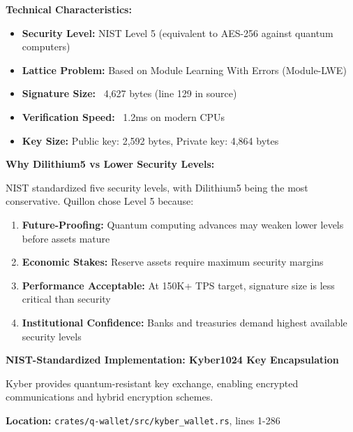 \documentclass[11pt,a4paper]{article}
\begin{document}
\textbf{Technical Characteristics:}
\begin{itemize}[leftmargin=*]
\item \textbf{Security Level:} NIST Level 5 (equivalent to AES-256 against quantum computers)
\item \textbf{Lattice Problem:} Based on Module Learning With Errors (Module-LWE)
\item \textbf{Signature Size:} ~4,627 bytes (line 129 in source)
\item \textbf{Verification Speed:} ~1.2ms on modern CPUs
\item \textbf{Key Size:} Public key: 2,592 bytes, Private key: 4,864 bytes
\end{itemize}

\textbf{Why Dilithium5 vs Lower Security Levels:}

NIST standardized five security levels, with Dilithium5 being the most conservative. Quillon chose Level 5 because:
\begin{enumerate}[leftmargin=*]
\item \textbf{Future-Proofing:} Quantum computing advances may weaken lower levels before assets mature
\item \textbf{Economic Stakes:} Reserve assets require maximum security margins
\item \textbf{Performance Acceptable:} At 150K+ TPS target, signature size is less critical than security
\item \textbf{Institutional Confidence:} Banks and treasuries demand highest available security levels
\end{enumerate}

\textbf{NIST-Standardized Implementation: Kyber1024 Key Encapsulation}

Kyber provides quantum-resistant key exchange, enabling encrypted communications and hybrid encryption schemes.

\textbf{Location:} \texttt{crates/q-wallet/src/kyber\_wallet.rs}, lines 1-286
\end{document}
